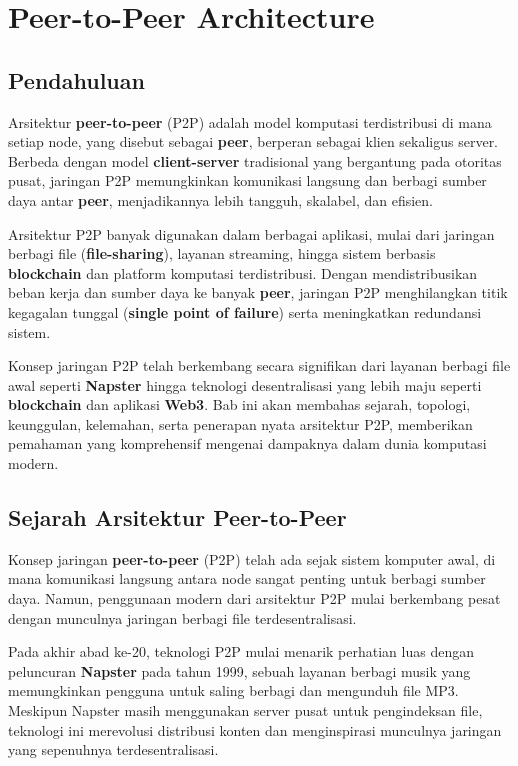 \chapter{Peer-to-Peer Architecture}

\section{Pendahuluan}

Arsitektur \textbf{peer-to-peer} (P2P) adalah model komputasi terdistribusi di mana setiap node, yang disebut sebagai \textbf{peer}, berperan sebagai klien sekaligus server. Berbeda dengan model \textbf{client-server} tradisional yang bergantung pada otoritas pusat, jaringan P2P memungkinkan komunikasi langsung dan berbagi sumber daya antar \textbf{peer}, menjadikannya lebih tangguh, skalabel, dan efisien.

Arsitektur P2P banyak digunakan dalam berbagai aplikasi, mulai dari jaringan berbagi file (\textbf{file-sharing}), layanan streaming, hingga sistem berbasis \textbf{blockchain} dan platform komputasi terdistribusi. Dengan mendistribusikan beban kerja dan sumber daya ke banyak \textbf{peer}, jaringan P2P menghilangkan titik kegagalan tunggal (\textbf{single point of failure}) serta meningkatkan redundansi sistem.

Konsep jaringan P2P telah berkembang secara signifikan dari layanan berbagi file awal seperti \textbf{Napster} hingga teknologi desentralisasi yang lebih maju seperti \textbf{blockchain} dan aplikasi \textbf{Web3}. Bab ini akan membahas sejarah, topologi, keunggulan, kelemahan, serta penerapan nyata arsitektur P2P, memberikan pemahaman yang komprehensif mengenai dampaknya dalam dunia komputasi modern.



\section{Sejarah Arsitektur Peer-to-Peer}

Konsep jaringan \textbf{peer-to-peer} (P2P) telah ada sejak sistem komputer awal, di mana komunikasi langsung antara node sangat penting untuk berbagi sumber daya. Namun, penggunaan modern dari arsitektur P2P mulai berkembang pesat dengan munculnya jaringan berbagi file terdesentralisasi.

Pada akhir abad ke-20, teknologi P2P mulai menarik perhatian luas dengan peluncuran \textbf{Napster} pada tahun 1999, sebuah layanan berbagi musik yang memungkinkan pengguna untuk saling berbagi dan mengunduh file MP3. Meskipun Napster masih menggunakan server pusat untuk pengindeksan file, teknologi ini merevolusi distribusi konten dan menginspirasi munculnya jaringan yang sepenuhnya terdesentralisasi.

